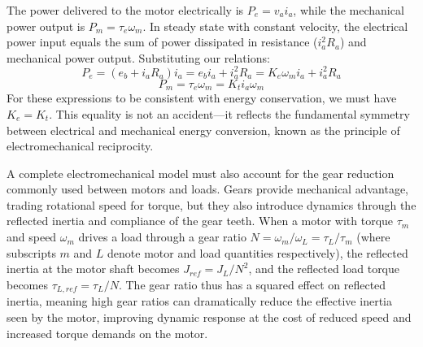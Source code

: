 The power delivered to the motor electrically is $P_e = v_a i_a$, while the mechanical power output is $P_m = \tau_e \omega_m$. In steady state with constant velocity, the electrical power input equals the sum of power dissipated in resistance ($i_a^2 R_a$) and mechanical power output. Substituting our relations:
\begin{equation}
P_e = (e_b + i_a R_a) i_a = e_b i_a + i_a^2 R_a = K_e \omega_m i_a + i_a^2 R_a
\end{equation}
\begin{equation}
P_m = \tau_e \omega_m = K_t i_a \omega_m
\end{equation}
For these expressions to be consistent with energy conservation, we must have $K_e = K_t$. This equality is not an accident—it reflects the fundamental symmetry between electrical and mechanical energy conversion, known as the principle of electromechanical reciprocity.

A complete electromechanical model must also account for the gear reduction commonly used between motors and loads. Gears provide mechanical advantage, trading rotational speed for torque, but they also introduce dynamics through the reflected inertia and compliance of the gear teeth. When a motor with torque $\tau_m$ and speed $\omega_m$ drives a load through a gear ratio $N = \omega_m / \omega_L = \tau_L / \tau_m$ (where subscripts $m$ and $L$ denote motor and load quantities respectively), the reflected inertia at the motor shaft becomes $J_{ref} = J_L / N^2$, and the reflected load torque becomes $\tau_{L,ref} = \tau_L / N$. The gear ratio thus has a squared effect on reflected inertia, meaning high gear ratios can dramatically reduce the effective inertia seen by the motor, improving dynamic response at the cost of reduced speed and increased torque demands on the motor.

